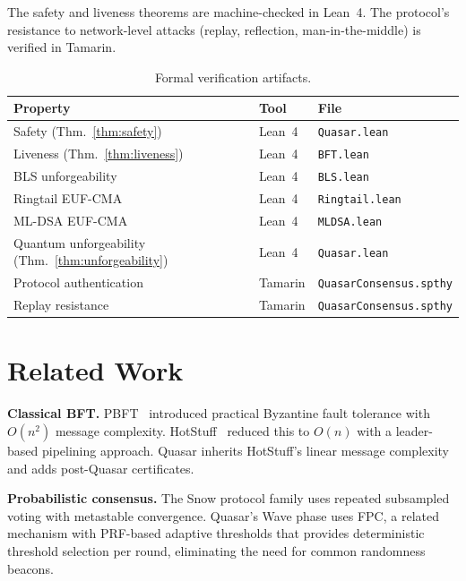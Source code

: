\documentclass[11pt,a4paper]{article}
\begin{document}
The safety and liveness theorems are machine-checked in Lean~4. The
protocol's resistance to network-level attacks (replay, reflection,
man-in-the-middle) is verified in Tamarin.

\begin{table}[ht]
\centering
\begin{tabular}{@{}lll@{}}
\toprule
\textbf{Property} & \textbf{Tool} & \textbf{File} \\
\midrule
Safety (Thm.~\ref{thm:safety})       & Lean~4  & \texttt{Quasar.lean} \\
Liveness (Thm.~\ref{thm:liveness})   & Lean~4  & \texttt{BFT.lean} \\
BLS unforgeability                     & Lean~4  & \texttt{BLS.lean} \\
Ringtail EUF-CMA                      & Lean~4  & \texttt{Ringtail.lean} \\
ML-DSA EUF-CMA                        & Lean~4  & \texttt{MLDSA.lean} \\
Quantum unforgeability (Thm.~\ref{thm:unforgeability}) & Lean~4 & \texttt{Quasar.lean} \\
Protocol authentication                & Tamarin & \texttt{QuasarConsensus.spthy} \\
Replay resistance                      & Tamarin & \texttt{QuasarConsensus.spthy} \\
\bottomrule
\end{tabular}
\caption{Formal verification artifacts.}
\label{tab:formal}
\end{table}


\section{Related Work}
\label{sec:related}

\textbf{Classical BFT.}
PBFT~\cite{castro1999practical} introduced practical Byzantine fault tolerance
with $O(n^2)$ message complexity. HotStuff~\cite{yin2019hotstuff} reduced this
to $O(n)$ with a leader-based pipelining approach. Quasar inherits HotStuff's
linear message complexity and adds post-Quasar certificates.

\textbf{Probabilistic consensus.}
The Snow protocol family uses repeated subsampled voting with metastable
convergence. Quasar's Wave phase uses FPC, a related mechanism with
PRF-based adaptive thresholds that provides deterministic threshold selection
per round, eliminating the need for common randomness beacons.
\end{document}
